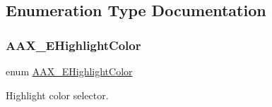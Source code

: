 \subsection{Enumeration Type Documentation}
\mbox{\label{a00491_a143056a07989a48e5db3a101f1b12567}} 
\subsubsection{\texorpdfstring{AAX\_EHighlightColor}{AAX\_EHighlightColor}}
{\footnotesize\ttfamily enum \mbox{\hyperlink{a00491_a143056a07989a48e5db3a101f1b12567}{A\+A\+X\+\_\+\+E\+Highlight\+Color}}}



Highlight color selector. 

